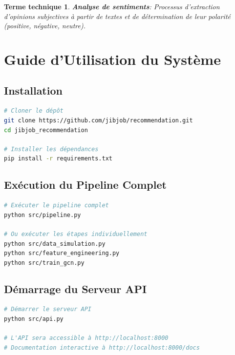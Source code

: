 \documentclass[12pt,a4paper]{article}
\newtheorem*{term}{Terme technique}
\begin{document}
\begin{term}
\textbf{Analyse de sentiments}: Processus d'extraction d'opinions subjectives à partir de textes et de détermination de leur polarité (positive, négative, neutre).
\end{term}

\section{Guide d'Utilisation du Système}

\subsection{Installation}

\begin{lstlisting}[language=bash, caption=Installation du système]
# Cloner le dépôt
git clone https://github.com/jibjob/recommendation.git
cd jibjob_recommendation

# Installer les dépendances
pip install -r requirements.txt
\end{lstlisting}

\subsection{Exécution du Pipeline Complet}

\begin{lstlisting}[language=bash, caption=Exécution du pipeline]
# Exécuter le pipeline complet
python src/pipeline.py

# Ou exécuter les étapes individuellement
python src/data_simulation.py
python src/feature_engineering.py
python src/train_gcn.py
\end{lstlisting}

\subsection{Démarrage du Serveur API}

\begin{lstlisting}[language=bash, caption=Démarrage de l'API]
# Démarrer le serveur API
python src/api.py

# L'API sera accessible à http://localhost:8000
# Documentation interactive à http://localhost:8000/docs
\end{lstlisting}
\end{document}
